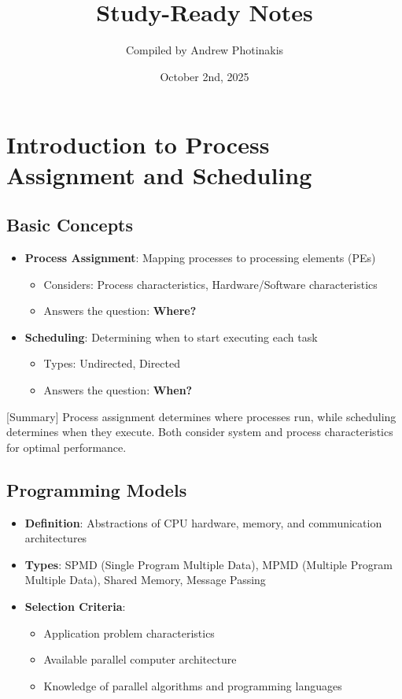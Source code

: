 \documentclass[12pt]{article}
\title{\TOPICTITLE\\\large Study-Ready Notes}
\author{Compiled by Andrew Photinakis}
\date{October 2nd, 2025}
\begin{document}
\maketitle
\tableofcontents
\newpage

\section{Introduction to Process Assignment and Scheduling}

\subsection{Basic Concepts}
\begin{itemize}
  \item \textbf{Process Assignment}: Mapping processes to processing elements (PEs)
        \begin{itemize}
          \item Considers: Process characteristics, Hardware/Software characteristics
          \item Answers the question: \textbf{Where?}
        \end{itemize}

  \item \textbf{Scheduling}: Determining when to start executing each task
        \begin{itemize}
          \item Types: Undirected, Directed
          \item Answers the question: \textbf{When?}
        \end{itemize}
\end{itemize}

[Summary] Process assignment determines where processes run, while scheduling determines when they execute. Both consider system and process characteristics for optimal performance.

\subsection{Programming Models}
\begin{itemize}
  \item \textbf{Definition}: Abstractions of CPU hardware, memory, and communication architectures
  \item \textbf{Types}: SPMD (Single Program Multiple Data), MPMD (Multiple Program Multiple Data), Shared Memory, Message Passing
  \item \textbf{Selection Criteria}:
        \begin{itemize}
          \item Application problem characteristics
          \item Available parallel computer architecture
          \item Knowledge of parallel algorithms and programming languages
        \end{itemize}
\end{itemize}
\end{document}
